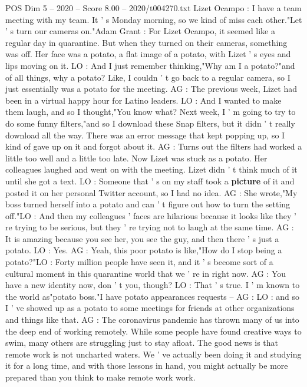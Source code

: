 \begin{textsample}{POS Dim 5 – 2020 – Score 8.00 – 2020/t004270.txt}  \label{ex:f5_pos_062}
Lizet Ocampo : I have a team meeting with my team.
It ' s Monday morning, so we kind of miss each other."Let ' s turn our cameras on."Adam Grant : For Lizet Ocampo, it seemed like a regular day in quarantine.
But when they turned on their cameras, something was off.
Her face was a potato, a flat image of a potato, with Lizet ' s eyes and lips moving on it.
LO : And I just remember thinking,"Why am I a potato?"and of all things, why a potato?
Like, I couldn ' t go back to a regular camera, so I just essentially was a potato for the meeting.
AG : The previous week, Lizet had been in a virtual happy hour for Latino leaders.
LO : And I wanted to make them laugh, and so I thought,"You know what?
Next week, I ' m going to try to do some funny filters,"and so I download these Snap filters, but it didn ' t really download all the way.
There was an error message that kept popping up, so I kind of gave up on it and forgot about it.
AG : Turns out the filters had worked a little too well and a little too late.
Now Lizet was stuck as a potato.
Her colleagues laughed and went on with the meeting.
Lizet didn ' t think much of it until she got a text.
LO : Someone that ' s on my staff took a \textbf{picture} of it and posted it on her personal Twitter account, so I had no idea.
AG : She wrote,"My boss turned herself into a potato and can ' t figure out how to turn the setting off."LO : And then my colleagues ' faces are hilarious because it looks like they ' re trying to be serious, but they ' re trying not to laugh at the same time.
AG : It is amazing because you see her, you see the guy, and then there ' s just a potato.
LO : Yes.
AG : Yeah, this poor potato is like,"How do I stop being a potato?"LO : Forty million people have seen it, and it ' s become sort of a cultural moment in this quarantine world that we ' re in right now.
AG : You have a new identity now, don ' t you, though?
LO : That ' s true.
I ' m known to the world as"potato boss."I have potato appearances requests -- AG : LO : and so I ' ve showed up as a potato to some meetings for friends at other organizations and things like that.
AG : The coronavirus pandemic has thrown many of us into the deep end of working remotely.
While some people have found creative ways to swim, many others are struggling just to stay afloat.
The good news is that remote work is not uncharted waters.
We ' ve actually been doing it and studying it for a long time, and with those lessons in hand, you might actually be more prepared than you think to make remote work work.

\end{textsample}
